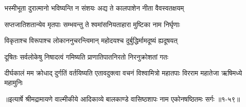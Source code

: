 \twolineshloka
{भस्मीभूता दुरात्मानो भविष्यन्ति न संशयः}
{अद्य ते कालपाशेन नीता वैवस्वतक्षयम्} %

\twolineshloka
{सप्तजातिशतान्येव मृतपाः सम्भवन्तु ते}
{श्वमांसनियताहारा मुष्टिका नाम निर्घृणाः} %

\twolineshloka
{विकृताश्च विरूपाश्च लोकाननुचरन्त्विमान्}
{महोदयश्च दुर्बुद्धिर्मामदूष्यं ह्यदूषयत्} %

\twolineshloka
{दूषितः सर्वलोकेषु निषादत्वं गमिष्यति}
{प्राणातिपातनिरतो निरनुक्रोशतां गतः} %

\threelineshloka
{दीर्घकालं मम क्रोधाद् दुर्गतिं वर्तयिष्यति}
{एतावदुक्त्वा वचनं विश्वामित्रो महातपाः}
{विरराम महातेजा ऋषिमध्ये महामुनिः} %


॥इत्यार्षे श्रीमद्रामायणे वाल्मीकीये आदिकाव्ये बालकाण्डे वासिष्ठशापः नाम एकोनषष्ठितमः सर्गः ॥१-५९॥
